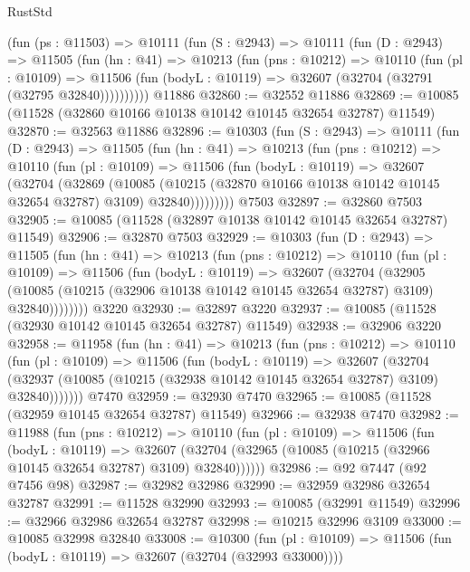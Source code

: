 \begin{lexlean}{RustStd}
\begin{coremodule}
    (fun (ps : @11503) =>
    @10111
      (fun (S : @2943) =>
      @10111
        (fun (D : @2943) =>
        @11505
          (fun (hn : @41) =>
          @10213
            (fun (pns : @10212) =>
            @10110
              (fun (pl : @10109) =>
              @11506 (fun (bodyL : @10119) => @32607 (@32704 (@32791 (@32795 @32840))))))))))
    @11886
@32860 := @32552 @11886
@32869 := @10085 (@11528 (@32860 @10166 @10138 @10142 @10145 @32654 @32787) @11549)
@32870 := @32563 @11886
@32896 := @10303
    (fun (S : @2943) =>
    @10111
      (fun (D : @2943) =>
      @11505
        (fun (hn : @41) =>
        @10213
          (fun (pns : @10212) =>
          @10110
            (fun (pl : @10109) =>
            @11506
              (fun (bodyL : @10119) =>
              @32607
                (@32704
                  (@32869
                    (@10085
                      (@10215 (@32870 @10166 @10138 @10142 @10145 @32654 @32787) @3109)
                      @32840)))))))))
    @7503
@32897 := @32860 @7503
@32905 := @10085 (@11528 (@32897 @10138 @10142 @10145 @32654 @32787) @11549)
@32906 := @32870 @7503
@32929 := @10303
    (fun (D : @2943) =>
    @11505
      (fun (hn : @41) =>
      @10213
        (fun (pns : @10212) =>
        @10110
          (fun (pl : @10109) =>
          @11506
            (fun (bodyL : @10119) =>
            @32607
              (@32704
                (@32905
                  (@10085 (@10215 (@32906 @10138 @10142 @10145 @32654 @32787) @3109) @32840))))))))
    @3220
@32930 := @32897 @3220
@32937 := @10085 (@11528 (@32930 @10142 @10145 @32654 @32787) @11549)
@32938 := @32906 @3220
@32958 := @11958
    (fun (hn : @41) =>
    @10213
      (fun (pns : @10212) =>
      @10110
        (fun (pl : @10109) =>
        @11506
          (fun (bodyL : @10119) =>
          @32607
            (@32704
              (@32937 (@10085 (@10215 (@32938 @10142 @10145 @32654 @32787) @3109) @32840)))))))
    @7470
@32959 := @32930 @7470
@32965 := @10085 (@11528 (@32959 @10145 @32654 @32787) @11549)
@32966 := @32938 @7470
@32982 := @11988
    (fun (pns : @10212) =>
    @10110
      (fun (pl : @10109) =>
      @11506
        (fun (bodyL : @10119) =>
        @32607 (@32704 (@32965 (@10085 (@10215 (@32966 @10145 @32654 @32787) @3109) @32840))))))
@32986 := @92 @7447 (@92 @7456 @98)
@32987 := @32982 @32986
@32990 := @32959 @32986 @32654 @32787
@32991 := @11528 @32990
@32993 := @10085 (@32991 @11549)
@32996 := @32966 @32986 @32654 @32787
@32998 := @10215 @32996 @3109
@33000 := @10085 @32998 @32840
@33008 := @10300
    (fun (pl : @10109) => @11506 (fun (bodyL : @10119) => @32607 (@32704 (@32993 @33000))))

\end{coremodule}
\end{lexlean}
